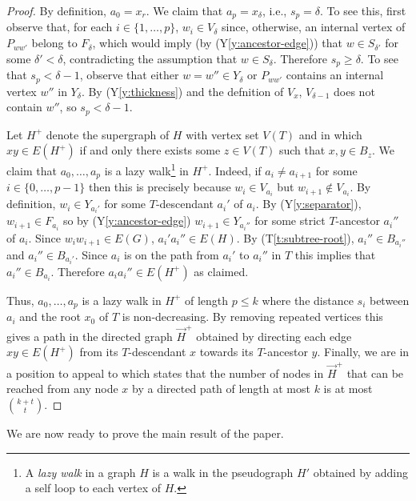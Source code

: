\documentclass{patmorin}
\newcommand{\tref}[1]{(T\ref{t:#1})}
\newcommand{\yref}[1]{(Y\ref{y:#1})}
\renewcommand{\ge}{\geqslant}
\renewcommand{\le}{\leqslant}
\begin{document}
\begin{proof}
  By definition, $a_0=x_r$.  We claim that $a_p=x_\delta$, i.e., $s_p=\delta$. 
  To see this, first observe that, for each $i\in\{1,\ldots,p\}$, $w_i\in V_{\delta}$ since, otherwise, an internal vertex of $P_{ww'}$ belong to $F_\delta$, which would imply (by \yref{ancestor-edge}) that $w\in S_{\delta'}$ for some $\delta' < \delta$, contradicting the assumption that $w\in S_\delta$.  Therefore $s_p\ge\delta$.  To see that $s_p<\delta-1$,
  observe that either $w=w''\in Y_\delta$ or $P_{ww'}$ contains an internal vertex $w''$ in $Y_\delta$.  By \yref{thickness} and the defnition of $V_x$, $V_{\delta-1}$ does not contain $w''$, so $s_p<\delta-1$.
  
  Let $H^+$ denote the supergraph of $H$ with vertex set $V(T)$ and in which $xy\in E(H^+)$ if and only there exists some $z\in V(T)$ such that $x,y\in B_z$. 
  We claim that $a_0,\ldots,a_p$ is a lazy walk\footnote{A \emph{lazy walk} in a graph $H$ is a walk in the pseudograph $H'$ obtained by adding a self loop to each vertex of $H$.} in $H^+$.  Indeed, if $a_i\neq a_{i+1}$ for some $i\in\{0,\ldots,p-1\}$ then this is precisely because $w_i\in V_{a_i}$ but $w_{i+1}\not\in V_{a_i}$.  By definition, $w_i\in Y_{a_i'}$ for some $T$-descendant $a_i'$ of $a_i$.
  By \yref{separator}, $w_{i+1}\in F_{a_i}$ so by \yref{ancestor-edge} $w_{i+1}\in Y_{a_i''}$ for some strict $T$-ancestor $a_i''$ of $a_i$.  Since $w_iw_{i+1}\in E(G)$, $a_i'a_i''\in E(H)$.  By \tref{subtree-root}, $a_i''\in B_{a_i''}$ and $a_i''\in B_{a_i'}$.  Since $a_i$ is on the path from $a_i'$ to $a_i''$ in $T$ this implies that $a_i''\in B_{a_i}$.  Therefore $a_ia_i''\in E(H^+)$ as claimed.
  
  Thus, $a_0,\ldots,a_p$ is a lazy walk in $H^+$ of length $p\le k$ where the distance $s_i$ between $a_i$ and the root $x_0$ of $T$ is non-decreasing.  By removing repeated vertices this gives a path in the directed graph $\overrightarrow{H}^+$ obtained by directing each edge $xy\in E(H^+)$ from its $T$-descendant $x$ towards its $T$-ancestor $y$. 
  Finally, we are in a position to appeal to \cite[Lemma~24]{pilipczuk.siebertz:polynomial-arxiv} which states that the number of nodes in $\overrightarrow{H}^+$ that can be reached from any node $x$ by a directed path of length at most $k$ is at most $\binom{k+t}{t}$.
\end{proof}

We are now ready to prove the main result of the paper. 
\end{document}
